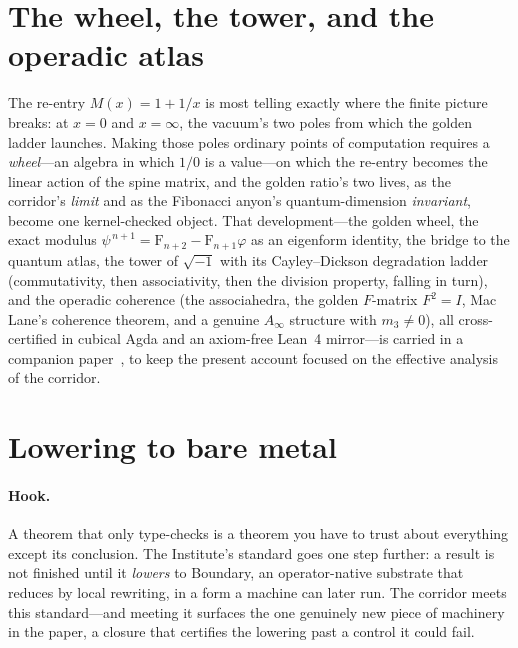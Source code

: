 \documentclass[11pt,letterpaper]{article}
\theoremstyle{plain}
\theoremstyle{definition}
\theoremstyle{remark}
\newcommand{\fib}{\mathrm{F}}                           %
\begin{document}
\section{The wheel, the tower, and the operadic atlas}\label{sec:wheel}

The re-entry $M(x)=1+1/x$ is most telling exactly where the finite picture breaks: at
$x=0$ and $x=\infty$, the vacuum's two poles from which the golden ladder launches. Making
those poles ordinary points of computation requires a \emph{wheel}---an algebra in which
$1/0$ is a value---on which the re-entry becomes the linear action of the spine matrix, and
the golden ratio's two lives, as the corridor's \emph{limit} and as the Fibonacci anyon's
quantum-dimension \emph{invariant}, become one kernel-checked object. That development---the
golden wheel, the exact modulus $\psi^{\,n+1}=\fib_{n+2}-\fib_{n+1}\varphi$ as an eigenform
identity, the bridge to the quantum atlas, the tower of $\sqrt{-1}$ with its
Cayley--Dickson degradation ladder (commutativity, then associativity, then the division
property, falling in turn), and the operadic coherence (the associahedra, the golden
$F$-matrix $F^2=I$, Mac Lane's coherence theorem, and a genuine $A_\infty$ structure with
$m_3\neq0$), all cross-certified in cubical Agda and an axiom-free Lean~4 mirror---is
carried in a companion paper~\citep{iaom_wheel}, to keep the present account focused on the
effective analysis of the corridor.

\section{Lowering to bare metal}\label{sec:metal}

\paragraph{Hook.}
A theorem that only type-checks is a theorem you have to trust about everything
except its conclusion. The Institute's standard goes one step further: a result is
not finished until it \emph{lowers} to Boundary, an operator-native substrate that
reduces by local rewriting, in a form a machine can later run. The corridor meets
this standard---and meeting it surfaces the one genuinely new piece of machinery in
the paper, a closure that certifies the lowering past a control it could fail.
\end{document}
